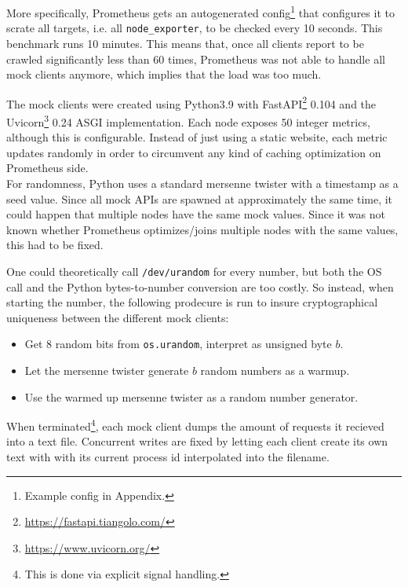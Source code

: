 More specifically, Prometheus gets an autogenerated config\footnote{Example config in Appendix.} that configures it to scrate all targets, i.e. all \texttt{node\_exporter}, to be checked every 10 seconds. This benchmark runs 10 minutes. This means that, once all clients report to be crawled significantly less than 60 times, Prometheus was not able to handle all mock clients anymore, which implies that the load was too much.

The mock clients were created using Python3.9 with FastAPI\footnote{\url{https://fastapi.tiangolo.com/}} 0.104 and the Uvicorn\footnote{\url{https://www.uvicorn.org/}} 0.24 \ac{ASGI} implementation. Each node exposes 50 integer metrics, although this is configurable. Instead of just using a static website, each metric updates randomly in order to circumvent any kind of caching optimization on Prometheus side.\\

For randomness, Python uses a standard mersenne twister with a timestamp as a seed value. Since all mock APIs are spawned at approximately the same time, it could happen that multiple nodes have the same mock values. Since it was not known whether Prometheus optimizes/joins multiple nodes with the same values, this had to be fixed.

One could theoretically call \texttt{/dev/urandom} for every number, but both the OS call and the Python bytes-to-number conversion are too costly. So instead, when starting the number, the following prodecure is run to insure cryptographical uniqueness between the different mock clients:
\begin{itemize}
  \item Get 8 random bits from \texttt{os.urandom}, interpret as unsigned byte $b$.
  \item Let the mersenne twister generate $b$ random numbers as a warmup.
  \item Use the warmed up mersenne twister as a random number generator.
\end{itemize}

When terminated\footnote{This is done via explicit signal handling.}, each mock client dumps the amount of requests it recieved into a text file. Concurrent writes are fixed by letting each client create its own text with with its current process id interpolated into the filename.\\

